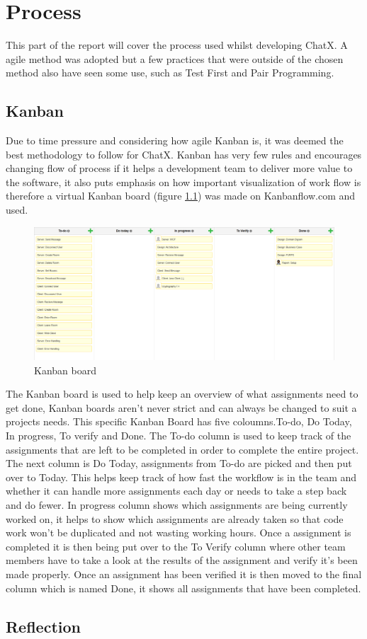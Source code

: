 \chapter{Process}
This part of the report will cover the process used whilst developing ChatX. A agile method was adopted but a few practices that were outside of the chosen method also have seen some use, such as Test First and Pair Programming.

\section{Kanban}
Due to time pressure and considering how agile Kanban is, it was deemed the best methodology to follow for ChatX. Kanban has very few rules and encourages changing flow of process if it helps a development team to deliver more value to the software, it also puts emphasis on how important visualization of work flow is therefore a virtual Kanban board (figure \ref{fig:KanbanBoard})  was made on Kanbanflow.com and used. 

\begin{figure}[H]
\centering
\includegraphics[width=0.7\linewidth]{"img/Kanban Board"}
\caption{Kanban board}
\label{fig:KanbanBoard}
\end{figure}

The Kanban board is used to help keep an overview of what assignments need to get done, Kanban boards aren't never strict and can always be changed to suit a projects needs.
This specific Kanban Board has five coloumns.To-do, Do Today, In progress, To verify and Done. The To-do column is used to keep track of the assignments that are left to be completed in order to complete the entire project. The next column is Do Today, assignments from To-do are picked and then put over to Today. This helps keep track of how fast the workflow is in the team and whether it can handle more assignments each day or needs to take a step back and do fewer. In progress column shows which assignments are being currently worked on, it helps to show which assignments are already taken so that code work won't be duplicated and not wasting working hours. Once a assignment is completed it is then being put over to the To Verify column where other team members have to take a look at the results of the assignment and verify it's been made properly. Once an assignment has been verified it is then moved to the final column which is named Done, it shows all assignments that have been completed.

\section{Reflection}